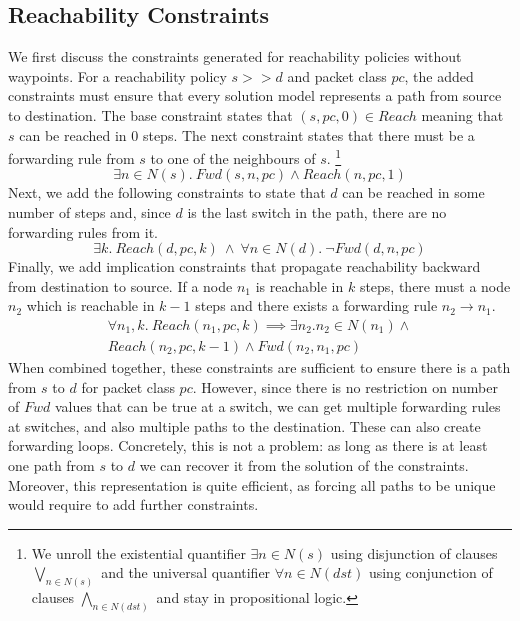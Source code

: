 \subsection{Reachability Constraints} \label{sec:reach}
We first discuss the constraints generated for reachability policies without waypoints.
For a reachability policy $s >> d$ and packet class $pc$, the added constraints must ensure that 
every solution model represents a path 
from source to destination. 
The base constraint states that $(s, pc,0) \in Reach$ meaning
that $s$ can be reached in $0$ steps. 
The next constraint states that there must be a forwarding rule from $s$ to one of
the neighbours of $s$.
\footnote{
	We unroll the existential quantifier $\exists n \in N(s)$ using disjunction of 
	clauses $\bigvee\limits_{n \in N(s)}$ and
	the universal quantifier $\forall n \in N(dst)$ using conjunction of clauses $\bigwedge\limits_{n \in N(dst)}$
	and stay in propositional logic.} 
\begin{equation} \label{eq:src}
	\exists n \in N(s).~Fwd(s, n, pc) \wedge Reach(n, pc, 1)
\end{equation}
Next, we add the following constraints to state that $d$ can be reached in some number of steps and,
since $d$ is the last switch in the path, there are no forwarding rules from it.
\begin{equation} \label{eq:dst}
	\exists k.~Reach(d, pc, k) \ \wedge \ \forall n \in N(d). \ \neg Fwd(d, n, pc)
\end{equation}
Finally, we add implication constraints that propagate reachability backward from destination to source. 
If a node $n_1$ is reachable in $k$ steps, there must a node $n_2$ which is reachable in  $k-1$ steps and there exists a forwarding rule $n_2 \rightarrow n_1$.
\begin{multline} \label{eq:bckprop}
\forall n_1,k.~ Reach(n_1,pc,k) \implies \exists n_2.  n_2 \in N(n_1) \wedge \\ Reach(n_2,pc,k-1) \wedge Fwd(n_2,n_1,pc)
\end{multline} 
When combined together, these constraints %
are sufficient to ensure there is a path from $s$ to $d$ for packet class $pc$.
However, since there is no restriction on number of $Fwd$ values that can be true at a switch, we can get multiple forwarding rules at switches, and 
also multiple paths to the destination. 
These can also create forwarding loops. 
Concretely, this is not a problem: as long as there is  at least one path from $s$ to $d$ we can recover it from the solution of the constraints. 
Moreover, this representation is quite efficient, as forcing all paths to be unique would
require to add further constraints.

